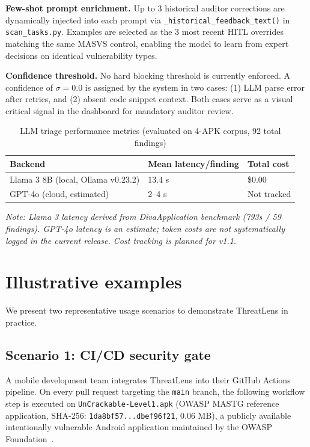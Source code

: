 \documentclass[preprint,12pt,a4paper]{elsarticle}
\begin{document}
\textbf{Few-shot prompt enrichment.} Up to 3 
historical auditor corrections are dynamically 
injected into each prompt via 
\texttt{\_historical\_feedback\_text()} in 
\texttt{scan\_tasks.py}. Examples are selected 
as the 3 most recent HITL overrides matching 
the same MASVS control, enabling the model to 
learn from expert decisions on identical 
vulnerability types.

\textbf{Confidence threshold.} No hard 
blocking threshold is currently enforced. 
A confidence of $\sigma = 0.0$ is assigned 
by the system in two cases: (1) LLM parse 
error after retries, and (2) absent code 
snippet context. Both cases serve as a 
visual critical signal in the dashboard 
for mandatory auditor review.

\begin{table}[h]
\caption{LLM triage performance metrics (evaluated on 4-APK corpus, 92 total findings)}
\label{tab:latency}
\begin{tabular}{lll}
\hline
Backend & Mean latency/finding & Total cost \\
\hline
Llama 3 8B (local, Ollama v0.23.2) & 
  13.4 s & \$0.00 \\
GPT-4o (cloud, estimated) & 
  2--4 s & Not tracked \\
\hline
\end{tabular}
\end{table}

\textit{Note: Llama 3 latency derived from 
DivaApplication benchmark (793s / 59 findings). 
GPT-4o latency is an estimate; token costs are 
not systematically logged in the current release. 
Cost tracking is planned for v1.1.}


\section{Illustrative examples}

We present two representative usage scenarios to demonstrate ThreatLens in practice.

\subsection{Scenario 1: CI/CD security gate}

A mobile development team integrates ThreatLens into their GitHub Actions pipeline. On every pull request targeting the \texttt{main} branch, the following workflow step is executed on \texttt{UnCrackable-Level1.apk} (OWASP MASTG reference application, SHA-256: \texttt{1da8bf57...dbef96f21}, 0.06 MB), a publicly available intentionally vulnerable Android application maintained by the OWASP Foundation~\cite{owasp_mastg}.
\end{document}
